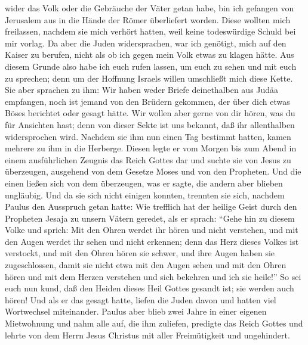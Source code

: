 wider das Volk oder die Gebräuche der Väter getan habe, bin ich gefangen
von Jerusalem aus in die Hände der Römer überliefert worden.
 Diese wollten mich freilassen, nachdem sie mich verhört
hatten, weil keine todeswürdige Schuld bei mir vorlag. 
Da aber die Juden widersprachen, war ich genötigt, mich auf den Kaiser
zu berufen, nicht als ob ich gegen mein Volk etwas zu klagen hätte.
 Aus diesem Grunde also habe ich euch rufen lassen, um
euch zu sehen und mit euch zu sprechen; denn um der Hoffnung Israels
willen umschließt mich diese Kette.  Sie aber sprachen zu
ihm: Wir haben weder Briefe deinethalben aus Judäa empfangen, noch ist
jemand von den Brüdern gekommen, der über dich etwas Böses berichtet
oder gesagt hätte.  Wir wollen aber gerne von dir hören,
was du für Ansichten hast; denn von dieser Sekte ist uns bekannt, daß
ihr allenthalben widersprochen wird.  Nachdem sie ihm nun
einen Tag bestimmt hatten, kamen mehrere zu ihm in die Herberge. Diesen
legte er vom Morgen bis zum Abend in einem ausführlichen Zeugnis das
Reich Gottes dar und suchte sie von Jesus zu überzeugen, ausgehend von
dem Gesetze Moses und von den Propheten.  Und die einen
ließen sich von dem überzeugen, was er sagte, die andern aber blieben
ungläubig.  Und da sie sich nicht einigen konnten,
trennten sie sich, nachdem Paulus den Ausspruch getan hatte: Wie
trefflich hat der heilige Geist durch den Propheten Jesaja zu unsern
Vätern geredet,  als er sprach: ``Gehe hin zu diesem
Volke und sprich: Mit den Ohren werdet ihr hören und nicht verstehen,
und mit den Augen werdet ihr sehen und nicht erkennen; 
denn das Herz dieses Volkes ist verstockt, und mit den Ohren hören sie
schwer, und ihre Augen haben sie zugeschlossen, damit sie nicht etwa mit
den Augen sehen und mit den Ohren hören und mit dem Herzen verstehen und
sich bekehren und ich sie heile!''  So sei euch nun kund,
daß den Heiden dieses Heil Gottes gesandt ist; sie werden auch hören!
 Und als er das gesagt hatte, liefen die Juden davon und
hatten viel Wortwechsel miteinander.  Paulus aber blieb
zwei Jahre in einer eigenen Mietwohnung und nahm alle auf, die ihm
zuliefen,  predigte das Reich Gottes und lehrte von dem
Herrn Jesus Christus mit aller Freimütigkeit und ungehindert.
